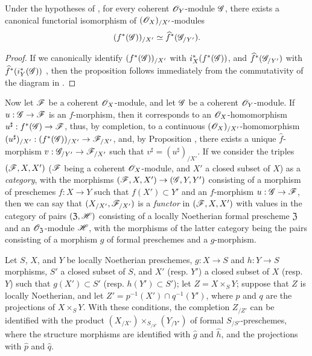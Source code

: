 \begin{proposition}[10.9.5]
\label{1.10.9.5}
Under the hypotheses of , for every coherent $\mathscr{O}_Y$-module $\mathscr{G}$, there exists a canonical functorial isomorphism of $(\mathscr{O}_X)_{/X'}$-modules
\[
  (f^*(\mathscr{G}))_{/X'}\simeq\widehat{f}^*(\mathscr{G}_{/Y'}).
\]
\end{proposition}

\begin{proof}
\label{proof-1.10.9.5}
If we canonically identify $(f^*(\mathscr{G}))_{/X'}$ with $i_X^*(f^*(\mathscr{G}))$, and $\widehat{f}^*(\mathscr{G}_{/Y'})$ with $\widehat{f}^*(i_Y^*(\mathscr{G}))$ , then the proposition follows immediately from the commutativity of the diagram in .
\end{proof}

\begin{env}[10.9.6]
\label{1.10.9.6}
Now let $\mathscr{F}$ be a coherent $\mathscr{O}_X$-module, and let $\mathscr{G}$ be a coherent $\mathscr{O}_Y$-module.
If $u:\sh{G}\to\sh{F}$ is an $f$-morphism, then it corresponds to an $\mathscr{O}_X$-homomorphism $u^\sharp:f^*(\sh{G})\to\sh{F}$, thus, by completion, to a continuous $(\mathscr{O}_X)_{/X'}$-homomorphism $(u^\sharp)_{/X'}:(f^*(\sh{G}))_{/X'}\to\sh{F}_{/X'}$, and, by Proposition , there exists a unique $\widehat{f}$-morphism $v:\sh{G}_{/Y'}\to\sh{F}_{/X'}$
such that $v^\sharp=(u^\sharp)_{/X'}$.
If we consider the triples $(\mathscr{F},X,X')$ ($\mathscr{F}$ being a coherent $\mathscr{O}_X$-module, and $X'$ a closed subset of $X$) as a \emph{category}, with the morphisms $(\sh{F},X,X')\to(\sh{G},Y,Y')$ consisting of a morphism of preschemes $f:X\to Y$ such that $f(X')\subset Y'$ and an $f$-morphism $u:\sh{G}\to\sh{F}$, then we can say that $(X_{/X'},\mathscr{F}_{/X'})$ is a \emph{functor} in $(\mathscr{F},X,X')$ with values in the category of pairs $(\mathfrak{Z},\mathscr{H})$ consisting of a locally Noetherian formal prescheme $\mathfrak{Z}$ and an $\mathscr{O}_\mathfrak{Z}$-module $\mathscr{H}$, with the morphisms of the latter category being the pairs consisting of a morphism $g$ of formal preschemes and a $g$-morphism.
\end{env}

\begin{proposition}[10.9.7]
\label{1.10.9.7}
Let $S$, $X$, and $Y$ be locally Noetherian preschemes, $g:X\to S$ and $h:Y\to S$ morphisms, $S'$ a closed subset of $S$, and $X'$ (resp. $Y'$) a closed subset of $X$ (resp. $Y$) such that $g(X')\subset S'$ (resp. $h(Y')\subset S'$); let $Z=X\times_S Y$; suppose that $Z$ is locally Noetherian, and let $Z'=p^{-1}(X')\cap q^{-1}(Y')$, where $p$ and $q$ are the projections of $X\times_S Y$.
With these conditions, the completion $Z_{/Z'}$ can be identified with the product $(X_{/X'})\times_{S_{/S'}}(Y_{/Y'})$ of formal $S_{/S'}$-preschemes, where the structure morphisms are identified with $\widehat{g}$ and $\widehat{h}$, and the projections with $\widehat{p}$ and $\widehat{q}$.
\end{proposition}

